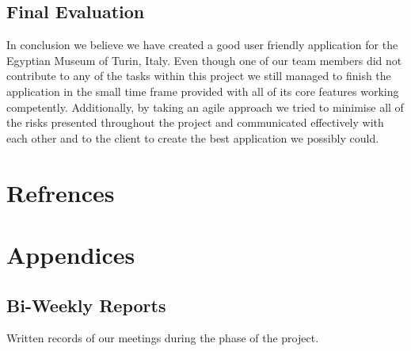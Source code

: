 \documentclass[12pt]{article}
\begin{document}
\subsection{Final Evaluation}
In conclusion we believe we have created a good user friendly application for the Egyptian Museum of Turin, Italy. Even though one of our team members did not contribute to any of the tasks within this project we still managed to finish the application in the small time frame provided with all of its core features working competently. Additionally, by taking an agile approach we tried to minimise all of the risks presented throughout the project and communicated effectively with each other and to the client to create the best application we possibly could. 


\newpage
\section{Refrences}


\newpage
\section{Appendices}
\subsection{Bi-Weekly Reports}
Written records of our meetings during the phase of the project.
\end{document}
